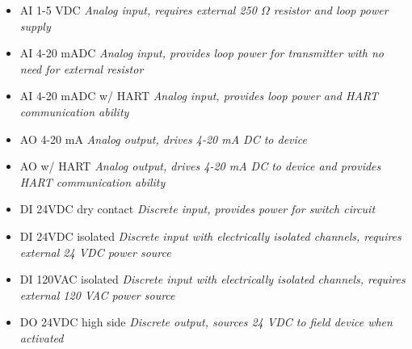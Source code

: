 





\begin{itemize}
\item{} AI 1-5 VDC {\it Analog input, requires external 250 $\Omega$ resistor and loop power supply}
\vskip 10pt
\item{} AI 4-20 mADC {\it Analog input, provides loop power for transmitter with no need for external resistor}
\vskip 10pt
\item{} AI 4-20 mADC w/ HART {\it Analog input, provides loop power and HART communication ability}
\vskip 10pt
\item{} AO 4-20 mA {\it Analog output, drives 4-20 mA DC to device}
\vskip 10pt
\item{} AO w/ HART {\it Analog output, drives 4-20 mA DC to device and provides HART communication ability}
\vskip 10pt
\item{} DI 24VDC dry contact {\it Discrete input, provides power for switch circuit}
\vskip 10pt
\item{} DI 24VDC isolated {\it Discrete input with electrically isolated channels, requires external 24 VDC power source}
\vskip 10pt
\item{} DI 120VAC isolated {\it Discrete input with electrically isolated channels, requires external 120 VAC power source}
\vskip 10pt
\item{} DO 24VDC high side {\it Discrete output, sources 24 VDC to field device when activated}
\end{itemize}











